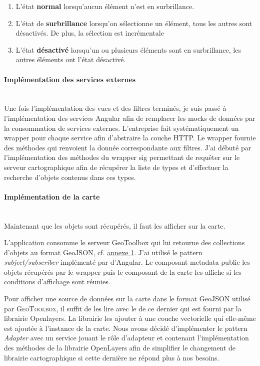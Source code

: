 \documentclass{rapportUHA40}
\begin{document}
\begin{enumerate}
  \item L'état \textbf{normal} lorsqu'aucun élément n'est en surbrillance.
  \item L'état de \textbf{surbrillance} lorsqu'on sélectionne un élément, tous les
        autres sont désactivés. De plus, la sélection est incrémentale
  \item L'état \textbf{désactivé} lorsqu'un ou plusieurs éléments sont en surbrillance,
        les autres éléments ont l'état désactivé.
\end{enumerate}

\paragraph{Implémentation des services externes}\mbox{}\\
Une fois l'implémentation des vues et des filtres terminés, je suis passé à
l'implémentation des services Angular afin de remplacer les mocks de données
par la consommation de services externes. L'entreprise fait systématiquement un
\gls{wrapper} pour chaque service afin d'abstraire la couche HTTP\@. Le wrapper
fournie des méthodes qui renvoient la donnée correspondante aux filtres. J'ai
débuté par l'implémentation des méthodes du \gls{wrapper} \gls{sig} permettant
de requêter sur le serveur cartographique afin de récupérer la liste de types
et d'effectuer la recherche d'objets contenus dans ces types. \\

\paragraph{Implémentation de la carte}\mbox{}\\
Maintenant que les objets sont récupérés, il faut les afficher sur la carte.


L'application consomme le serveur GeoToolbox qui lui retourne des collections
d'objets au format GeoJSON, cf. \hyperlink{ANNEX1}{annexe 1}. J'ai utilisé le
pattern \textit{subject/subscriber} implémenté par d'Angular. Le composant
metadata publie les objets récupérés par le wrapper puis le composant de la
carte les affiche si les conditions d'affichage sont réunies.

Pour afficher une source de données sur la carte dans le format GeoJSON utilisé
par \textsc{GeoToolbox}, il suffit de les lire avec le  \fg{} de ce
dernier qui est fourni par la librairie Openlayers. La librairie les ajouter à
une couche vectorielle qui elle-même est ajoutée à l'instance de la carte. Nous
avons décidé d'implémenter le pattern \textit{Adapter} avec un service jouant
le rôle d'adapteur et contenant l'implémentation des méthodes de la librairie
OpenLayers afin de simplifier le changement de librairie cartographique si
cette dernière ne répond plus à nos besoins.
\end{document}
